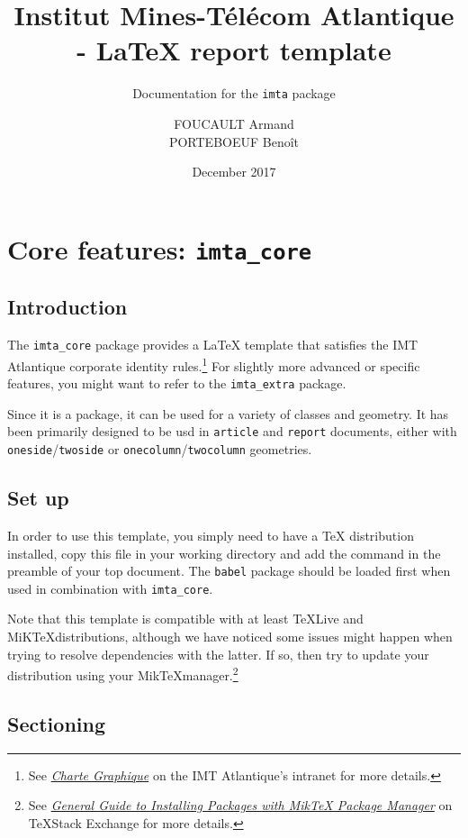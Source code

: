 \documentclass{report}
\author{FOUCAULT Armand\\PORTEBOEUF Benoît}
\date{December 2017}
\title{Institut Mines-Télécom Atlantique - \LaTeX{} report template}
\subtitle{Documentation for the \texttt{imta} package}
\begin{document}
	
\imtaMaketitlepage

\tableofcontents

\newpage

\chapter{Core features: \texttt{imta\_core}}

\section{Introduction}
The \texttt{imta\_core} package provides a \LaTeX{} template that satisfies the IMT Atlantique corporate identity rules.\footnote{See \textit{\href{https://intranet.imt-atlantique.fr/wp-content/uploads/2017/01/imt_atlantique_chartegraphique.pdf}{Charte Graphique}} on the IMT Atlantique's intranet for more details.} For slightly more advanced or specific features, you might want to refer to the \texttt{imta\_extra} package.

Since it is a package, it can be used for a variety of classes and geometry. It has been primarily designed to be usd in \texttt{article} and \texttt{report} documents, either with \texttt{oneside}/\texttt{twoside} or \texttt{onecolumn}/\texttt{twocolumn} geometries.

\section{Set up}
In order to use this template, you simply need to have a \TeX{} distribution installed, copy this file in your working directory and add the  command in the preamble of your top document. The \texttt{babel} package should be loaded first when used in combination with \texttt{imta\_core}.

Note that this template is compatible with at least \TeX Live and MiK\TeX distributions, although we have noticed some issues might happen when trying to resolve dependencies with the latter. If so, then try to update your distribution using your Mik\TeX manager.\footnote{See \textit{\href{https://tex.stackexchange.com/a/359851}{General Guide to Installing Packages with MikTeX Package Manager}} on \TeX Stack Exchange for more details.}


\section{Sectioning}
\end{document}
